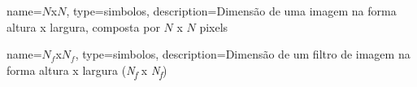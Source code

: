 {%
	name=$N$x$N$,
	type=simbolos,
	description={Dimensão de uma imagem na forma altura x largura, composta por $N$ x $N$ pixels}
}

{%
	name=$N_{f}$x$N_{f}$,
	type=simbolos,
	description={Dimensão de um filtro de imagem na forma altura x largura (\textit{N\textsubscript{f}} x \textit{N\textsubscript{f}})}
}